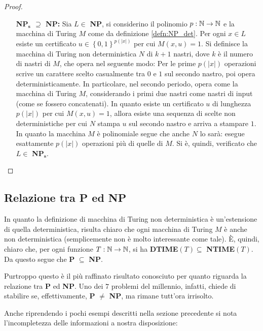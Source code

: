 \begin{proof}
\begin{enumerate}[align=left]
  \item[\textbf{NP$_\mathbf{s}$ $\supseteq$ NP:}] Sia $L \in$ \textbf{NP}, si considerino il polinomio $p: \mathbb{N} \to \mathbb{N}$ e la macchina di Turing $M$ come da definizione \ref{defn:NP_det}.
  Per ogni $x \in L$ esiste un certificato $u \in \left\{0,1\right\}^{p(|x|)}$ per cui $M(x,u)=1$.
  Si definisce la macchina di Turing non deterministica $N$ di $k+1$ nastri, dove $k$ è il numero di nastri di $M$, che opera nel seguente modo:
  Per le prime $p(|x|)$ operazioni scrive un carattere scelto casualmente tra $0$ e $1$ sul secondo nastro, poi opera deterministicamente.
  In particolare, nel secondo periodo, opera come la macchina di Turing $M$, considerando i primi due nastri come nastri di input (come se fossero concatenati).
  In quanto esiste un certificato $u$ di lunghezza $p(|x|)$ per cui $M(x,u)=1$, allora esiste una sequenza di scelte non deterministiche per cui $N$ stampa $u$ sul secondo nastro e arriva a stampare $1$.
  In quanto la macchina $M$ è polinomiale segue che anche $N$ lo sarà: esegue esattamente $p(|x|)$ operazioni più di quelle di $M$.
  Si è, quindi, verificato che $L \in$ \textbf{NP$_\mathbf{s}$}.\qedhere
 \end{enumerate}
\end{proof}

\subsection{Relazione tra P ed NP}
In quanto la definizione di macchina di Turing non deterministica è un'estensione di quella deterministica, risulta chiaro che ogni macchina di Turing $M$ è anche non deterministica (semplicemente non è molto interessante come tale).
È, quindi, chiaro che, per ogni funzione $T: \mathbb{N} \to \mathbb{N}$, si ha \textbf{DTIME}$(T) \subseteq$ \textbf{NTIME}$(T)$.
Da questo segue che \textbf{P} $\subseteq$ \textbf{NP}.

Purtroppo questo è il più raffinato risultato conosciuto per quanto riguarda la relazione tra \textbf{P} ed \textbf{NP}.
Uno dei $7$ problemi del millennio, infatti, chiede di stabilire se, effettivamente, \textbf{P} $\neq$ \textbf{NP}, ma rimane tutt'ora irrisolto.

Anche riprendendo i pochi esempi descritti nella sezione precedente si nota l'incompletezza delle informazioni a nostra disposizione:


